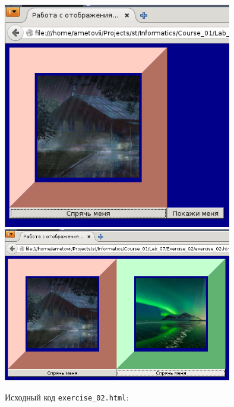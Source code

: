 \begin{center}
  \includegraphics[width=10cm]{img/Exercise_02/04.png}
  \includegraphics[width=10cm]{img/Exercise_02/05.png}
\end{center}

Исходный код \verb|exercise_02.html|:


